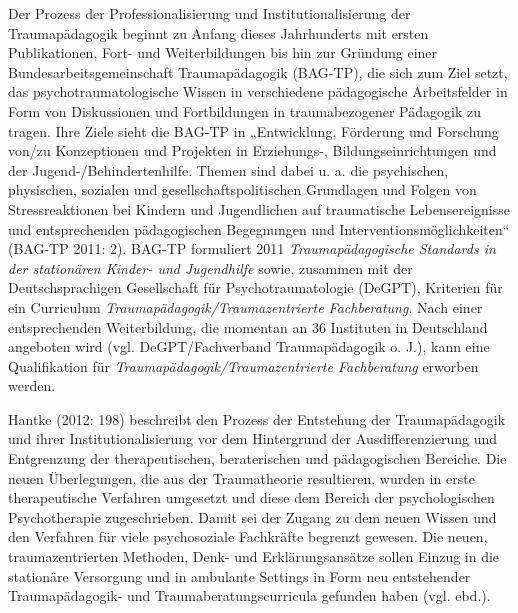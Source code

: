 Der Prozess der Professionalisierung und Institutionalisierung der Traumapädagogik beginnt zu Anfang dieses Jahrhunderts mit ersten Publikationen, Fort- und Weiterbildungen bis hin zur Gründung einer Bundesarbeitsgemeinschaft Traumapädagogik (BAG-TP), die sich zum Ziel setzt, das psychotraumatologische Wissen in verschiedene pädagogische Arbeitsfelder in Form von Diskussionen und Fortbildungen in traumabezogener Pädagogik zu tragen. Ihre Ziele sieht die BAG-TP in „Entwicklung, Förderung und Forschung von/zu Konzeptionen und Projekten in Erziehungs-, Bildungseinrichtungen und der Jugend-/Behindertenhilfe. Themen sind dabei u. a. die psychischen, physischen, sozialen und gesellschaftspolitischen Grundlagen und Folgen von Stressreaktionen bei Kindern und Jugendlichen auf traumatische Lebensereignisse und entsprechenden pädagogischen Begegnungen und Interventionsmöglichkeiten“ (BAG-TP 2011: 2). BAG-TP formuliert 2011 \textit{Traumapädagogische Standards in der stationären Kinder- und Jugendhilfe} sowie, zusammen mit der Deutschsprachigen Gesellschaft für Psychotraumatologie (DeGPT), Kriterien für ein Curriculum \textit{Traumapädagogik/Traumazentrierte Fachberatung}. Nach einer entsprechenden Weiterbildung, die momentan an 36 Instituten in Deutschland angeboten wird (vgl. DeGPT/Fachverband Traumapädagogik o. J.), kann eine Qualifikation für \textit{Traumapädagogik/Traumazentrierte Fachberatung} erworben werden.

Hantke (2012: 198) beschreibt den Prozess der Entstehung der Traumapädagogik und ihrer Institutionalisierung vor dem Hintergrund der Ausdifferenzierung und Entgrenzung der therapeutischen, beraterischen und pädagogischen Bereiche. Die neuen Überlegungen, die aus der Traumatheorie resultieren, wurden in erste therapeutische Verfahren umgesetzt und diese dem Bereich der psychologischen Psychotherapie zugeschrieben. Damit sei der Zugang zu dem neuen Wissen und den Verfahren für viele psychosoziale Fachkräfte begrenzt gewesen. Die neuen, traumazentrierten Methoden, Denk- und Erklärungsansätze sollen Einzug in die stationäre Versorgung und in ambulante Settings in Form neu entstehender Traumapädagogik- und Traumaberatungscurricula gefunden haben (vgl. ebd.).
